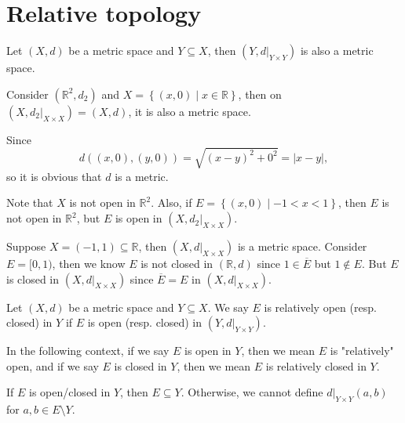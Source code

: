 \section{Relative topology}
Let \((X,d)\) be a metric space and \(Y \subseteq X\), then \(\left( Y, d\vert_{Y \times Y} \right) \) is also a metric space. 
\begin{eg}
    Consider \((\mathbb{R} ^2, d_2)\) and \(X = \left\{ (x, 0) \mid x \in \mathbb{R}  \right\} \), then on \(\left( X, d_2\vert_{X \times X} \right) = (X, d)\), it is also a metric space. 
\end{eg} 
\begin{explanation}
    Since 
    \[
        d((x,0),(y,0)) = \sqrt{(x-y)^2 + 0 ^2} = \vert x - y \vert, 
    \] so it is obvious that \(d\) is a metric. 
    
    Note that \(X\) is not open in \(\mathbb{R} ^2\). Also, if \(E = \left\{ (x, 0) \mid -1 < x < 1 \right\} \), then \(E\) is not open in \(\mathbb{R} ^2\), but \(E\) is open in \(\left( X, d_2 \vert_{X \times X} \right) \).       
\end{explanation}

\begin{eg}
    Suppose \(X = (-1, 1) \subseteq \mathbb{R} \), then \(\left( X, d \vert_{X \times X} \right) \) is a metric space. Consider \(E = [0, 1)\), then we know \(E\) is not closed in \((\mathbb{R} , d)\) since \(1 \in \overline{E} \) but \(1 \notin E\). But \(E\) is closed in \(\left( X, d\vert_{X \times X} \right) \) since \(\overline{E} = E\) in \((X, d\vert_{X \times X})\).          
\end{eg}

\begin{definition}
    Let \((X, d)\) be a metric space and \(Y \subseteq X\). We say \(E\) is relatively open (resp. closed) in \(Y\) if \(E\) is open (resp. closed) in \((Y, d\vert_{Y \times Y})\).     
\end{definition}

\begin{note}
    In the following context, if we say \(E\) is open in \(Y\), then we mean \(E\) is "relatively" open, and if we say \(E\) is closed in \(Y\), then we mean \(E\) is relatively closed in \(Y\).       
\end{note}

\begin{note}
    If \(E\) is open/closed in \(Y\), then \(E \subseteq Y\). Otherwise, we cannot define \(d\vert_{Y \times Y}(a, b)\) for \(a, b \in E\setminus Y\).     
\end{note}

